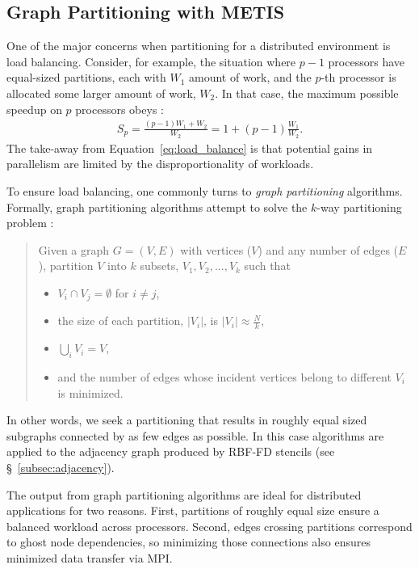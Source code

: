 \documentclass{report}
\begin{document}
\subsection{Graph Partitioning with METIS}

One of the major concerns when partitioning for a distributed environment is load balancing. Consider, for example, the situation where $p-1$ processors have equal-sized partitions, each with $W_1$ amount of work, and the $p$-th processor is allocated some larger amount of work, $W_2$. In that case, the maximum possible speedup on $p$ processors obeys \cite{Gropp1990}:  
\begin{align}
S_p = \frac{(p-1) W_1 + W_2}{W_2} = 1 + (p-1)\frac{W_1}{W_2}.
\label{eq:load_balance}
\end{align}
The take-away from Equation~\ref{eq:load_balance} is that potential gains in parallelism are limited by the disproportionality of workloads. 

To ensure load balancing, one commonly turns to \emph{graph partitioning} algorithms. Formally, graph partitioning algorithms attempt to solve the $k$-way partitioning problem \cite{Karypis1999}: 

\begin{quote} Given a graph $G = (V,E)$ with vertices ($V$) and any number of edges ($E$), partition $V$ into $k$ subsets, $V_1, V_2, ..., V_k$ such that 
\begin{itemize} 
\item $V_i \cap V_j = \emptyset$ for $i \neq j$,
\item the size of each partition, $|V_i|$, is $|V_i| \approx \frac{N}{k}$, 
\item $\bigcup_i V_i = V$,
\item and the number of edges whose incident vertices belong to different $V_i$ is minimized.
\end{itemize}
\end{quote} 
In other words, we seek a partitioning that results in roughly equal sized subgraphs connected by as few edges as possible. 
In this case algorithms are applied to the adjacency graph produced by RBF-FD stencils (see \S~\ref{subsec:adjacency}).

The output from graph partitioning algorithms are ideal for distributed applications for two reasons. First, partitions of roughly equal size ensure a balanced workload across processors. Second, edges crossing partitions correspond to ghost node dependencies, so minimizing those connections also ensures minimized data transfer via MPI. 
\end{document}
